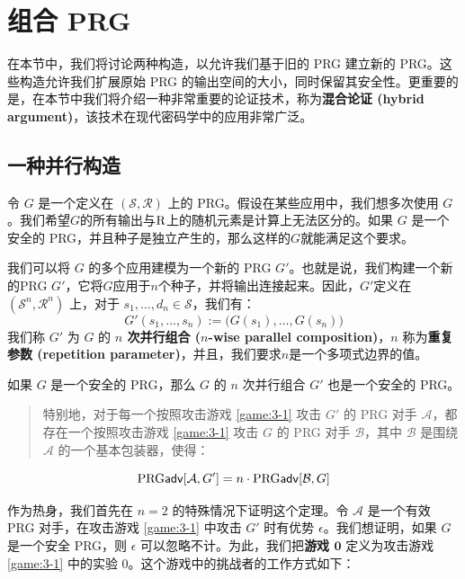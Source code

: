 \section{组合 PRG}

在本节中，我们将讨论两种构造，以允许我们基于旧的 PRG 建立新的 PRG。这些构造允许我们扩展原始 PRG 的输出空间的大小，同时保留其安全性。更重要的是，在本节中我们将介绍一种非常重要的论证技术，称为\textbf{混合论证 (hybrid argument)}，该技术在现代密码学中的应用非常广泛。

\subsection{一种并行构造}

令 $G$ 是一个定义在 $(\mathcal S,\mathcal R)$ 上的 PRG。假设在某些应用中，我们想多次使用 $G$。我们希望$G$的所有输出与$\mathcal{\rm R}$上的随机元素是计算上无法区分的。如果 $G$ 是一个安全的 PRG，并且种子是独立产生的，那么这样的$G$就能满足这个要求。

我们可以将 $G$ 的多个应用建模为一个新的 PRG $G'$。也就是说，我们构建一个新的PRG $G'$，它将$G$应用于$n$个种子，并将输出连接起来。因此，$G'$定义在 $(\mathcal S^n,\mathcal R^n)$ 上，对于 $s_1,\dots,d_n\in\mathcal S$，我们有：
$$
G'(s_1,\dots,s_n):=\big(G(s_1),\dots,G(s_n)\big)
$$
我们称 $G'$ 为 $G$ 的 \textbf{$n$ 次并行组合 ($n$-wise parallel composition)}，$n$ 称为\textbf{重复参数 (repetition parameter)}，并且，我们要求$n$是一个多项式边界的值。

\begin{theorem}\label{theo:3-2}
如果 $G$ 是一个安全的 PRG，那么 $G$ 的 $n$ 次并行组合 $G'$ 也是一个安全的 PRG。
\begin{quote}
特别地，对于每一个按照攻击游戏 \ref{game:3-1} 攻击 $G'$ 的 PRG 对手 $\mathcal A$，都存在一个按照攻击游戏 \ref{game:3-1} 攻击 $G$ 的 PRG 对手 $\mathcal B$，其中 $\mathcal B$ 是围绕 $\mathcal A$ 的一个基本包装器，使得：
\end{quote}
$$
{\rm PRG\mathsf{adv}}[\mathcal{A},G']=n\cdot{\rm PRG\mathsf{adv}}[\mathcal{B},G]
$$
\end{theorem}

作为热身，我们首先在 $n=2$ 的特殊情况下证明这个定理。令 $\mathcal A$ 是一个有效 PRG 对手，在攻击游戏 \ref{game:3-1} 中攻击 $G'$ 时有优势 $\epsilon$。我们想证明，如果 $G$ 是一个安全 PRG，则 $\epsilon$ 可以忽略不计。为此，我们把\textbf{游戏 $\mathbf{0}$} 定义为攻击游戏 \ref{game:3-1} 中的实验 $0$。这个游戏中的挑战者的工作方式如下：

\vspace*{5pt}

